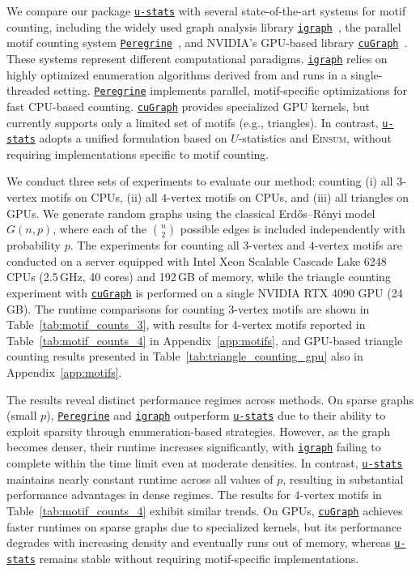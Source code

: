 \documentclass[sn-mathphys, natbib=false]{sn-jnl}
\newcommand{\libref}[2]{\href{#2}{\texttt{#1}}}
\def\package{\libref{u-stats}{https://github.com/zrq1706/U-Statistics-Python}}
\def\igraph{\libref{igraph}{https://igraph.org/}}
\theoremstyle{plain}
\theoremstyle{definition}
\def\Einsum{\textsc{Einsum}}
\def\package{\libref{u-stats}{https://github.com/zrq1706/U-Statistics-Python}}
\def\igraph{\libref{igraph}{https://igraph.org/}}
\def\peregrine{\libref{Peregrine}{https://github.com/pdclab/peregrine}}
\def\cugraph{\libref{cuGraph}{https://docs.rapids.ai/api/cugraph/stable/}}
\begin{document}
\begin{bibunit}[agsm]
We compare our package \package{} with several state-of-the-art systems for motif counting, including the widely used graph analysis library \igraph{}~\citep{csardi2006igraph}, the parallel motif counting system \peregrine{}~\citep{jamshidi2020peregrine}, and NVIDIA's GPU-based library \cugraph{}~\citep{fender2022rapids}. These systems represent different computational paradigms. 
\igraph{} relies on highly optimized enumeration algorithms derived from \citet{wernicke2006fanmod} and runs in a single-threaded setting. 
\peregrine{} implements parallel, motif-specific optimizations for fast CPU-based counting. 
\cugraph{} provides specialized GPU kernels, but currently supports only a limited set of motifs (e.g., triangles). In contrast, \package{} adopts a unified formulation based on $U$-statistics and \Einsum{}, without requiring implementations specific to motif counting.

We conduct three sets of experiments to evaluate our method: counting (i) all $3$-vertex motifs on CPUs, (ii) all $4$-vertex motifs on CPUs, and (iii) all triangles on GPUs. 
We generate random graphs using the classical Erd\H{o}s--R\'enyi model $G(n, p)$, where each of the $\binom{n}{2}$ possible edges is included independently with probability $p$. The experiments for counting all $3$-vertex and $4$-vertex motifs are conducted on a server equipped with Intel Xeon Scalable Cascade Lake 6248 CPUs (2.5\,GHz, 40 cores) and 192\,GB of memory, while the triangle counting experiment with \cugraph{} is performed on a single NVIDIA RTX 4090 GPU (24\,GB). 
The runtime comparisons for counting 3-vertex motifs are shown in Table~\ref{tab:motif_counts_3}, with results for 4-vertex motifs reported in Table~\ref{tab:motif_counts_4} in Appendix~\ref{app:motifs}, and GPU-based triangle counting results presented in Table~\ref{tab:triangle_counting_gpu} also in Appendix~\ref{app:motifs}.

The results reveal distinct performance regimes across methods. 
On sparse graphs (small $p$), \peregrine{} and  \igraph{} outperform \package{} due to their ability to exploit sparsity through enumeration-based strategies. 
However, as the graph becomes denser, their runtime increases significantly, with \igraph{} failing to complete within the time limit even at moderate densities. In contrast, \package{} maintains nearly constant runtime across all values of $p$, resulting in substantial performance advantages in dense regimes. 
The results for 4-vertex motifs in Table~\ref{tab:motif_counts_4} exhibit similar trends. 
On GPUs, \cugraph{} achieves faster runtimes on sparse graphs due to specialized kernels, but its performance degrades with increasing density and eventually runs out of memory, whereas \package{} remains stable without requiring motif-specific implementations.


\end{bibunit}
\end{document}

